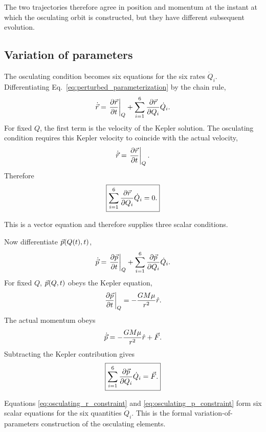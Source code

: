 	The two trajectories therefore agree in position and momentum at the
	instant at which the osculating orbit is constructed, but they have
	different subsequent evolution.
	
	\subsection{Variation of parameters}
	
	The osculating condition becomes six equations for the six rates $\dot Q_i$. Differentiating Eq.~\eqref{eq:perturbed_parameterization} by the chain rule,
	\begin{equation}
		\dot{\vec r}
		=
		\left.\pdv{\vec r}{t}\right|_Q
		+
		\sum_{i=1}^{6}
		\pdv{\vec r}{Q_i}\dot Q_i .
		\label{eq:r_chain_rule}
	\end{equation}
	For fixed $Q$, the first term is the velocity of the Kepler solution.
	The osculating condition requires this Kepler velocity to coincide with
	the actual velocity,
	\begin{equation}
		\dot{\vec r}
		=
		\left.\pdv{\vec r}{t}\right|_Q.
	\end{equation}
	Therefore
	\begin{equation}
		\boxed{
			\sum_{i=1}^{6}
			\pdv{\vec r}{Q_i}\dot Q_i=0 .
		}
		\label{eq:osculating_r_constraint}
	\end{equation}
	
	This is a vector equation and therefore supplies three scalar
	conditions.
	
	Now differentiate $\vec p(Q(t),t)$,
	\begin{equation}
		\dot{\vec p}
		=
		\left.\pdv{\vec p}{t}\right|_Q
		+
		\sum_{i=1}^{6}
		\pdv{\vec p}{Q_i}\dot Q_i .
		\label{eq:p_chain_rule}
	\end{equation}
	For fixed $Q$, $\vec p(Q,t)$ obeys the Kepler equation,
	\begin{equation}
		\left.\pdv{\vec p}{t}\right|_Q
		=
		-\frac{GM\mu}{r^2}\hat r .
	\end{equation}
	The actual momentum obeys
	\begin{equation}
		\dot{\vec p}
		=
		-\frac{GM\mu}{r^2}\hat r+\vec F.
	\end{equation}
	Subtracting the Kepler contribution gives
	\begin{equation}
		\boxed{
			\sum_{i=1}^{6}
			\pdv{\vec p}{Q_i}\dot Q_i
			=
			\vec F .
		}
		\label{eq:osculating_p_constraint}
	\end{equation}
	
	Equations \eqref{eq:osculating_r_constraint} and
	\eqref{eq:osculating_p_constraint} form six scalar equations for the
	six quantities $\dot Q_i$.  This is the formal variation-of-parameters
	construction of the osculating elements.
	
